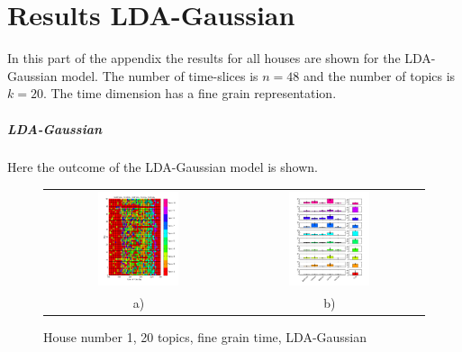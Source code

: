 \chapter{Results LDA-Gaussian}
\label{A}
In this part of the appendix the results for all houses are shown for the LDA-Gaussian model. The number of time-slices is $n=48$ and the number of topics is $k=20$. The time dimension has a fine grain representation.

\paragraph{LDA-Gaussian}
Here the outcome of the LDA-Gaussian model is shown.

\begin{figure}[h!]
 \centering
 \begin{tabular}{c c}
  \includegraphics[width=0.45\textwidth]{Pictures/Gaus/fine/DayHN1TS48k20fine.png}
  &
  \includegraphics[width=0.45\textwidth]{Pictures/Gaus/fine/TopHN1TS48k20fine.png}\\
  a) & b)
 \end{tabular}
  \caption{House number 1, 20 topics, fine grain time, LDA-Gaussian}
\end{figure}

